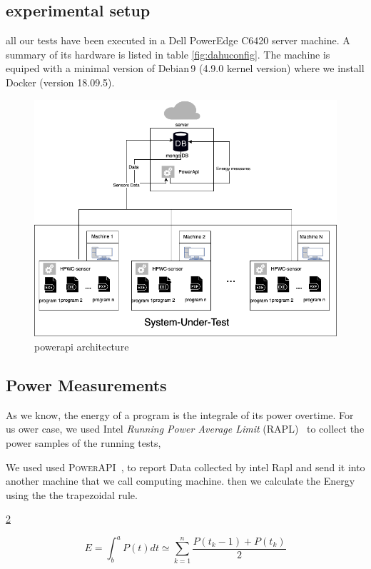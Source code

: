 \subsection{experimental setup}

all our tests have been executed in a Dell PowerEdge C6420 server machine. A summary of its hardware is listed in table \ref{fig:dahuconfig}. The machine is equiped with a minimal version of Debian\,9 (4.9.0 kernel version) where we install Docker (version 18.09.5).


\begin{figure}[hbt]
    \includegraphics[width=\linewidth]{imgs/SmartWatts.png}
    \caption{powerapi architecture}
    \label{fig:powerapi}

\end{figure}
\subsection{Power Measurements}

As we know, the energy of a program is the integrale of its power overtime. For us ower case, we used Intel \emph{Running Power Average Limit} (RAPL)~\cite{Khan:2018:RAE:3199681.3177754} to collect the power samples of the running tests,

We used used \textsc{PowerAPI}~\cite{DBLP:journals/jss/ColmantRKSFS18}, to report Data collected by intel Rapl and send it into another machine that we call computing machine. then we calculate the Energy using  the the trapezoidal rule.


\ref{fig:trapezrule}
\begin{figure}[hbt]
    \centering
    \begin{equation}
        E = \int^a_b P(t)dt \simeq \sum^n_{k=1} \frac{P(t_k-1)+P(t_k)}{2}
    \end{equation}
    \caption{}
    \label{fig:trapezrule}
\end{figure}



